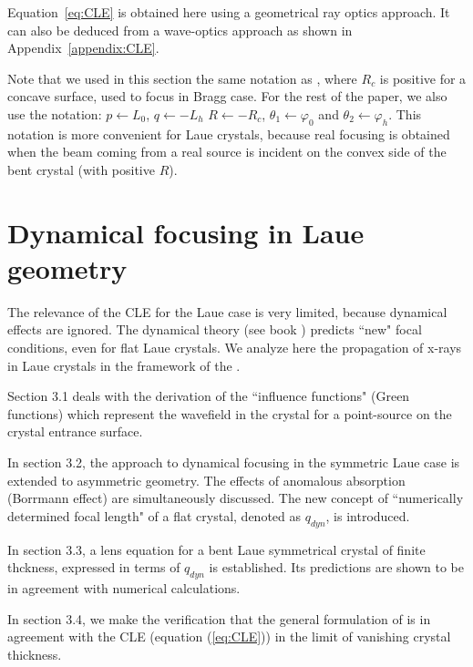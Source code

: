 \documentclass[preprint]{iucr}              %
\newcommand{\inred}[1]{{\color{red}#1}}
\begin{document}
Equation~\ref{eq:CLE} is obtained here using a geometrical ray optics approach. It can also be deduced from a wave-optics approach as shown in Appendix~\ref{appendix:CLE}. 

Note that we used in this section the same notation as \cite{CK}, where $R_c$ is positive for a concave surface, used to focus in Bragg case. For the rest of the paper, we \inred{also use} the notation: $p \leftarrow L_0$, $q \leftarrow -L_h$ $R \leftarrow -R_c$, $\theta_1 \leftarrow \varphi_0$ and $\theta_2 \leftarrow \varphi_h$.
This notation \inred{is more convenient} for Laue crystals, because real focusing is obtained when the beam coming from a real source is incident on the convex side of the bent crystal (with positive $R$).

\section{Dynamical focusing in Laue geometry}
\label{sec:dynamlicalLaue}

The \inred{relevance} of the CLE for the Laue case is very limited, \inred{because} dynamical effects \inred{are ignored}. The dynamical theory \inred{(see book \cite{authierbook})}
predicts ``new" focal conditions, even for flat Laue crystals.
We analyze here the propagation of x-rays \inred{in} Laue crystals in the framework of the  \inred{\cite{Takagi1962, Takagi, Taupin, Taupin1967}}. 


\inred{
Section 3.1 deals with the derivation of the ``influence functions" (Green functions) which represent the wavefield in the crystal for a point-source on the crystal entrance surface.

In section 3.2, the approach to dynamical focusing in the symmetric Laue case
\cite{kushnir, GuigayFerrero2013}
is extended to asymmetric geometry. The effects of anomalous absorption (Borrmann effect) are simultaneously discussed. The new concept of ``numerically determined focal length" of a flat crystal, denoted as $q_{dyn}$, is introduced.

In section 3.3, a lens equation for a bent Laue symmetrical crystal of finite thckness, expressed in terms of $q_{dyn}$ is established. Its predictions are shown to be in agreement with numerical calculations. 

In section 3.4, we make the verification that the general formulation of
\cite{GuigayFerrero2016} is in agreement with the CLE (equation (\ref{eq:CLE})) in the limit of vanishing crystal thickness.}
\end{document}
